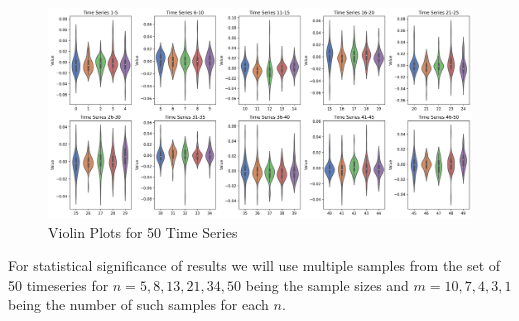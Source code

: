 \begin{figure}[H]
  \centering
  \includegraphics[width=\textwidth]{images/violin_plots_50_timeseries.png}
  \caption{Violin Plots for 50 Time Series}
  \label{fig:violin_plots}
\end{figure}


For statistical significance of results we will use multiple samples from the set of 50 timeseries for $n = 5,8,13,21,34,50$ being the sample sizes and $m=10,7,4,3,1$ being the number of such samples for each $n$.

































